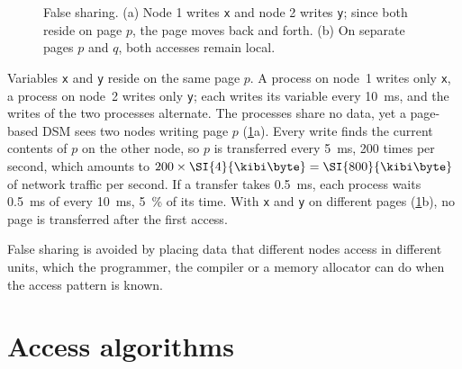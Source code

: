 \documentclass[../main.tex]{subfiles}
\begin{document}
\begin{figure}[htbp]
  \centering
  
  \caption{False sharing.  (a) Node 1 writes \texttt{x} and node 2 writes
    \texttt{y}; since both reside on page $p$, the page moves back and
    forth.  (b) On separate pages $p$ and $q$, both accesses remain local.}
  \label{fig:l15-false-sharing}
\end{figure}

\begin{example}
  Variables \texttt{x} and \texttt{y} reside on the same page $p$.  A
  process on node~1 writes only \texttt{x}, a process on node~2 writes
  only \texttt{y}; each writes its variable every \SI{10}{\milli\second},
  and the writes of the two processes alternate.  The processes share no
  data, yet a page-based DSM sees two nodes writing page $p$
  (\cref{fig:l15-false-sharing}a).  Every write finds the current contents
  of $p$ on the other node, so $p$ is transferred every
  \SI{5}{\milli\second}, 200 times per second, which amounts to
  $200\times\SI{4}{\kibi\byte} = \SI{800}{\kibi\byte}$ of network traffic
  per second.  If a transfer takes \SI{0.5}{\milli\second}, each process
  waits \SI{0.5}{\milli\second} of every \SI{10}{\milli\second},
  \SI{5}{\percent} of its time.  With \texttt{x} and \texttt{y} on
  different pages (\cref{fig:l15-false-sharing}b), no page is transferred
  after the first access.
\end{example}

False sharing is avoided by placing data that different nodes access in
different units, which the programmer, the compiler or a memory allocator
can do when the access pattern is known.

\section{Access algorithms}
\label{sec:l15-access}
\end{document}
